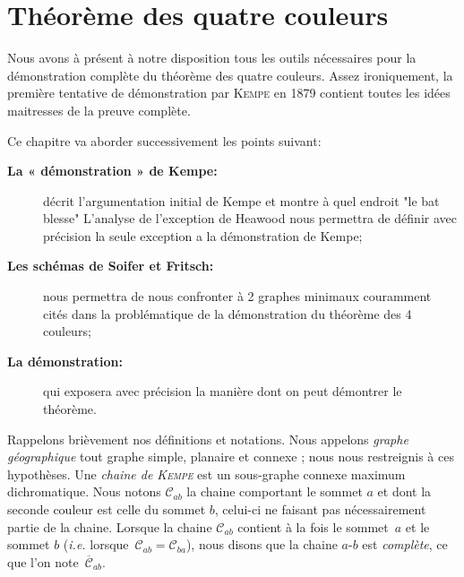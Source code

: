 \chapter{Théorème des quatre couleurs}

Nous avons à présent à notre disposition tous les outils nécessaires pour la démonstration complète du théorème des quatre couleurs. Assez ironiquement, la première tentative de démonstration par \textsc{Kempe} en 1879 contient toutes les idées maitresses de la preuve complète.\\
\begin{changemargin}{0cm}{0cm}
Ce chapitre va aborder successivement les points suivant:
\end{changemargin}
\begin{description}

\item[\textbf{La « démonstration » de Kempe:}] décrit l'argumentation initial de Kempe et montre à quel endroit "le bat blesse"
L'analyse de l’exception de Heawood nous permettra de définir avec précision la seule exception a la démonstration de Kempe; 
\item[\textbf{Les schémas de Soifer et Fritsch:}] nous permettra de nous confronter à 2 graphes minimaux couramment cités dans la problématique de la démonstration du théorème des 4 couleurs;
\item[\textbf{La démonstration:}] qui exposera avec précision la manière dont on peut démontrer le théorème.\\
\end{description}



Rappelons brièvement nos définitions et notations. Nous appelons \textit{graphe géographique} tout graphe simple, planaire et connexe ; nous nous restreignis à ces hypothèses. Une \textit{chaine de \textsc{Kempe}} est un sous-graphe connexe maximum dichromatique. Nous notons $\mathcal{C}_{ab}$ la chaine comportant le sommet $a$ et dont la seconde couleur est celle du sommet $b$, celui-ci ne faisant pas nécessairement partie de la chaine. Lorsque la chaine $\mathcal{C}_{ab}$ contient à la fois le sommet~$a$ et le sommet $b$ (\textit{i.e.} lorsque~$\mathcal{C}_{ab}=\mathcal{C}_{ba}$), nous disons que la chaine $a$-$b$ est \textit{complète}, ce que l'on note~$\overline{\mathcal{C}}_{ab}$.

